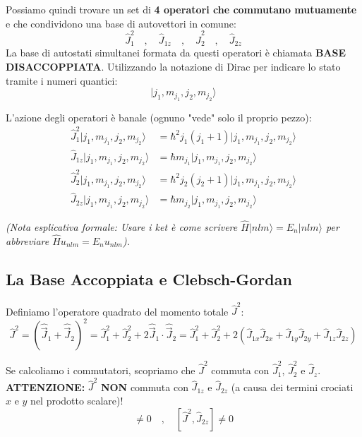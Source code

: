 \documentclass[11pt, a4paper]{article}
\begin{document}
\noindent
Possiamo quindi trovare un set di \textbf{4 operatori che commutano mutuamente} e che condividono una base di autovettori in comune: %
\begin{equation*}
    \hat{J}_1^2 \quad , \quad \hat{J}_{1z} \quad , \quad \hat{J}_2^2 \quad , \quad \hat{J}_{2z} %
\end{equation*}
La base di autostati simultanei formata da questi operatori è chiamata \textbf{BASE DISACCOPPIATA}. Utilizzando la notazione di Dirac per indicare lo stato tramite i numeri quantici: %
\begin{equation}
    \boxed{ |j_1, m_{j_1}, j_2, m_{j_2}\rangle } %
\end{equation}

L'azione degli operatori è banale (ognuno "vede" solo il proprio pezzo): %
\begin{align*}
    \hat{J}_1^2 |j_1, m_{j_1}, j_2, m_{j_2}\rangle &= \hbar^2 j_1(j_1+1) |j_1, m_{j_1}, j_2, m_{j_2}\rangle \\ %
    \hat{J}_{1z} |j_1, m_{j_1}, j_2, m_{j_2}\rangle &= \hbar m_{j_1} |j_1, m_{j_1}, j_2, m_{j_2}\rangle \\
    \hat{J}_2^2 |j_1, m_{j_1}, j_2, m_{j_2}\rangle &= \hbar^2 j_2(j_2+1) |j_1, m_{j_1}, j_2, m_{j_2}\rangle \\ %
    \hat{J}_{2z} |j_1, m_{j_1}, j_2, m_{j_2}\rangle &= \hbar m_{j_2} |j_1, m_{j_1}, j_2, m_{j_2}\rangle
\end{align*}

\noindent
\textit{(Nota esplicativa formale: Usare i ket è come scrivere $\hat{H}|nlm\rangle = E_n|nlm\rangle$ per abbreviare $\hat{H}u_{nlm} = E_n u_{nlm}$).} %

\subsection{La Base Accoppiata e Clebsch-Gordan} %

Definiamo l'operatore quadrato del momento totale $\hat{J}^2$: %
\begin{equation*}
    \hat{J}^2 = (\hat{\vec{J}}_1 + \hat{\vec{J}}_2)^2 = \hat{J}_1^2 + \hat{J}_2^2 + 2\hat{\vec{J}}_1 \cdot \hat{\vec{J}}_2 = \hat{J}_1^2 + \hat{J}_2^2 + 2(\hat{J}_{1x}\hat{J}_{2x} + \hat{J}_{1y}\hat{J}_{2y} + \hat{J}_{1z}\hat{J}_{2z}) %
\end{equation*}

\noindent
Se calcoliamo i commutatori, scopriamo che $\hat{J}^2$ commuta con $\hat{J}_1^2$, $\hat{J}_2^2$ e $\hat{J}_z$. %
\textbf{ATTENZIONE:} $\hat{J}^2$ \textbf{NON} commuta con $\hat{J}_{1z}$ e $\hat{J}_{2z}$ (a causa dei termini crociati $x$ e $y$ nel prodotto scalare)! %
\begin{equation*}
    [\hat{J}^2, \hat{J}_{1z}] \neq 0 \quad , \quad [\hat{J}^2, \hat{J}_{2z}] \neq 0 %
\end{equation*}
\end{document}
